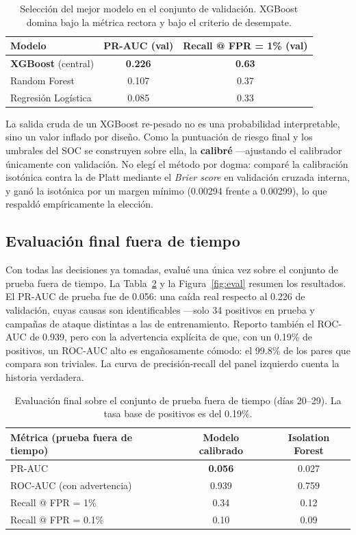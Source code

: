 \documentclass[12pt, a4paper]{article}
\begin{document}
\begin{table}[!htb]
\centering
\small
\setlength{\tabcolsep}{6pt}
\begin{tabular}{lcc}
\toprule
\textbf{Modelo} & \textbf{PR-AUC (val)} & \textbf{Recall @ FPR = 1\% (val)} \\
\midrule
\textbf{XGBoost} (central) & \textbf{0.226} & \textbf{0.63} \\
Random Forest & 0.107 & 0.37 \\
Regresión Logística & 0.085 & 0.33 \\
\bottomrule
\end{tabular}
\caption{Selección del mejor modelo en el conjunto de validación. XGBoost domina bajo la métrica
rectora y bajo el criterio de desempate.}
\label{tab:seleccion}
\end{table}

La salida cruda de un XGBoost re-pesado no es una probabilidad interpretable, sino un valor inflado
por diseño. Como la puntuación de riesgo final y los umbrales del SOC se construyen sobre ella, la
\textbf{calibré} ---ajustando el calibrador únicamente con validación. No elegí el método por dogma:
comparé la calibración isotónica contra la de Platt mediante el \textit{Brier score} en validación
cruzada interna, y ganó la isotónica por un margen mínimo (0.00294 frente a 0.00299), lo que respaldó
empíricamente la elección.

\subsection{Evaluación final fuera de tiempo}

Con todas las decisiones ya tomadas, evalué una única vez sobre el conjunto de prueba fuera de tiempo.
La Tabla~\ref{tab:eval} y la Figura~\ref{fig:eval} resumen los resultados. El PR-AUC de prueba fue de
0.056: una caída real respecto al 0.226 de validación, cuyas causas son identificables ---solo 34
positivos en prueba y campañas de ataque distintas a las de entrenamiento. Reporto también el ROC-AUC
de 0.939, pero con la advertencia explícita de que, con un 0.19\% de positivos, un ROC-AUC alto es
engañosamente cómodo: el 99.8\% de los pares que compara son triviales. La curva de precisión-recall
del panel izquierdo cuenta la historia verdadera.

\begin{table}[!htb]
\centering
\small
\setlength{\tabcolsep}{6pt}
\begin{tabular}{lcc}
\toprule
\textbf{Métrica (prueba fuera de tiempo)} & \textbf{Modelo calibrado} & \textbf{Isolation Forest} \\
\midrule
PR-AUC & \textbf{0.056} & 0.027 \\
ROC-AUC (con advertencia) & 0.939 & 0.759 \\
Recall @ FPR = 1\% & 0.34 & 0.12 \\
Recall @ FPR = 0.1\% & 0.10 & 0.09 \\
\bottomrule
\end{tabular}
\caption{Evaluación final sobre el conjunto de prueba fuera de tiempo (días 20--29). La tasa base de
positivos es del 0.19\%.}
\label{tab:eval}
\end{table}
\end{document}
